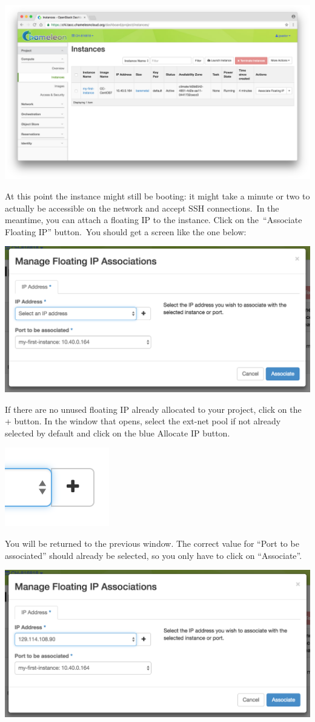 \includegraphics[width=0.8\columnwidth]{images/chameleon/Screen-Shot-2016-10-26-at-16-22-38.png}

At this point the instance might still be booting: it might take a
minute or two to actually be accessible on the network and accept SSH
connections.~In the meantime, you can attach a floating IP to the
instance. Click on the~``Associate Floating IP'' button.~You should get
a screen like the one below:

\includegraphics[width=0.8\columnwidth]{images/chameleon/Screen-Shot-2016-10-26-at-16-25-04.png}

If there are no unused floating IP already allocated to your project,
click on the + button. In the window that opens, select the ext-net pool
if not already selected by default and click on the blue Allocate IP
button.

\includegraphics[width=0.1\columnwidth]{images/chameleon/Screen-Shot-2016-10-26-at-16-33-45-W05kOLQ.png}

You will be returned to the previous window. The correct value for
``Port to be associated'' should already be selected, so you only have
to click on ``Associate''.

\includegraphics[width=0.8\columnwidth]{images/chameleon/Screen-Shot-2016-10-26-at-16-25-10.png}

